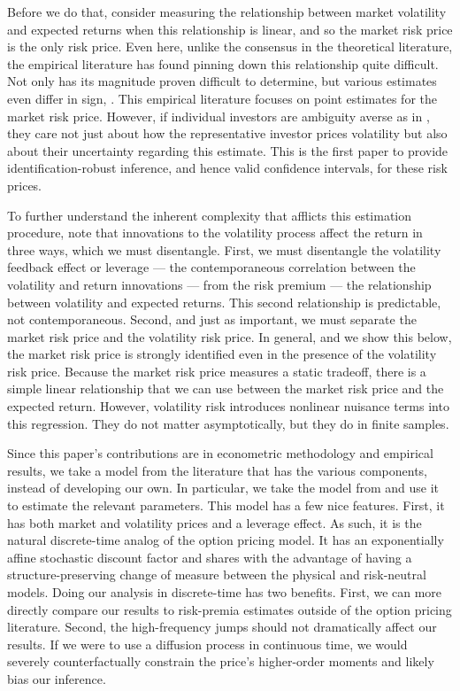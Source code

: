 \documentclass[11pt, letterpaper, twoside]{article}
\begin{document}
Before we do that, consider measuring the relationship between market volatility and expected returns when this relationship is linear, and so the market risk price is the only risk price. Even here, unlike the consensus in the theoretical literature, the empirical literature has found pinning down this relationship quite difficult. Not only has its magnitude proven difficult to determine, but various estimates even differ in sign, \parencites{brandt2004relationship, lettau2010measuring}. This empirical literature focuses on point estimates for the market risk price. However, if individual investors are ambiguity averse as in \textcite{hansen2001robust, jiu2012ambiguity}, they care not just about how the representative investor prices volatility but also about their uncertainty regarding this estimate. This is the first paper to provide identification-robust inference, and hence valid confidence intervals, for these risk prices. 

To further understand the inherent complexity that afflicts this estimation procedure, note that innovations to the volatility process affect the return in three ways, which we must disentangle. First, we must disentangle the volatility feedback effect or leverage --- the contemporaneous correlation between the volatility and return innovations --- from the risk premium --- the relationship between volatility and expected returns. This second relationship is predictable, not contemporaneous. Second, and just as important, we must separate the market risk price and the volatility risk price. In general, and we show this below, the market risk price is strongly identified even in the presence of the volatility risk price. Because the market risk price measures a static tradeoff, there is a simple linear relationship that we can use between the market risk price and the expected return. However, volatility risk introduces nonlinear nuisance terms into this regression. They do not matter asymptotically, but they do in finite samples.

Since this paper's contributions are in econometric methodology and empirical results, we take a model from the literature that has the various components, instead of developing our own. In particular, we take the model from \textcite{han2018leverage} and use it to estimate the relevant parameters. This model has a few nice features. First, it has both market and volatility prices and a leverage effect. As such, it is the natural discrete-time analog of the \textcite{heston1993closedform} option pricing model. It has an exponentially affine stochastic discount factor and shares with \textcite{heston1993closedform} the advantage of having a structure-preserving change of measure between the physical and risk-neutral models. Doing our analysis in discrete-time has two benefits. First, we can more directly compare our results to risk-premia estimates outside of the option pricing literature. Second, the high-frequency jumps should not dramatically affect our results. If we were to use a diffusion process in continuous time, we would severely counterfactually constrain the price's higher-order moments and likely bias our inference. 
\end{document}
